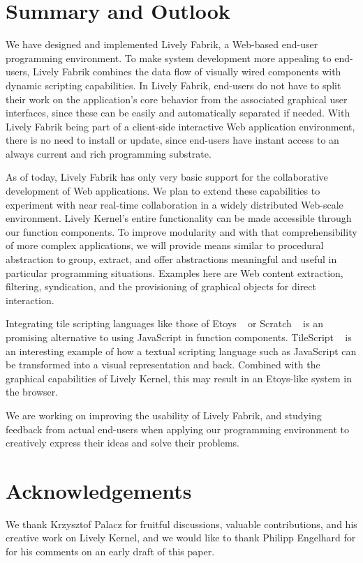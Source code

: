 \documentclass[pdftex, times, 10pt, twocolumn]{article}
\begin{document}
\section{Summary and Outlook}
We have designed and implemented Lively Fabrik, a Web-based end-user programming environment. To make system development more appealing to end-users, Lively Fabrik combines the data flow of visually wired components with dynamic scripting capabilities. In Lively Fabrik, end-users do not have to split their work on the application's core behavior from the associated graphical user interfaces, since these can be easily and automatically separated if needed. With Lively Fabrik being part of a client-side interactive Web application environment, there is no need to install or update, since end-users have instant access to an always current and rich programming substrate. 

As of today, Lively Fabrik has only very basic support for the collaborative development of Web applications. We plan to extend these capabilities to experiment with near real-time collaboration in a widely distributed Web-scale environment. Lively Kernel's entire functionality can be made accessible through our function components. To improve modularity and with that comprehensibility of more complex applications, we will provide means similar to procedural abstraction to group, extract, and offer abstractions meaningful and useful in particular programming situations. Examples here are Web content extraction, filtering, syndication, and the provisioning of graphical objects for direct interaction. 

Integrating tile scripting languages like those of Etoys ~\cite{Kay2005SEA} or Scratch ~\cite{Maloney2004SSP} is an promising alternative to using JavaScript in function components. TileScript ~\cite{Warth2008TMS} is an interesting example of how a textual scripting language such as JavaScript can be transformed into a visual representation and back. Combined with the graphical capabilities of Lively Kernel, this may result in an Etoys-like system in the browser. 

We are working on improving the usability of Lively Fabrik, and studying feedback from actual end-users when applying our programming environment to creatively express their ideas and solve their problems. 



\section{Acknowledgements}
We thank Krzysztof Palacz for fruitful discussions, valuable contributions, and his creative work on Lively Kernel, and we would like to thank Philipp Engelhard for for his comments on an early draft of this paper.  

 



 
\end{document}
